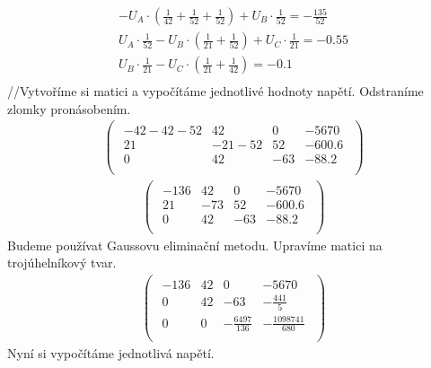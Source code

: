     \begin{gather*}
		-U_A \cdot(\frac{1}{42} + \frac{1}{52} + \frac{1}{52}) + U_B \cdot \frac{1}{52} = -\frac{135}{52}\\
        U_A \cdot \frac{1}{52} - U_B \cdot (\frac{1}{21} + \frac{1}{52}) + U_C \cdot \frac{1}{21} = - 0.55\\
        U_B \cdot \frac{1}{21} - U_C \cdot (\frac{1}{21} + \frac{1}{42}) = -0.1\\
	\end{gather*}
    //Vytvoříme si matici a vypočítáme jednotlivé hodnoty napětí. Odstraníme zlomky pronásobením.
    \begin{gather*}
		\begin{pmatrix}
        \begin{array}{ccc|c}
            -42-42-52 & 42 & 0 &  -5670 \\
            21 & -21-52 & 52  &  -600.6 \\
            0 & 42 & -63 & -88.2 \\
        \end{array}
        \end{pmatrix}
	\end{gather*}
	\begin{gather*}
		\begin{pmatrix}
        \begin{array}{ccc|c}
            -136 & 42 & 0 &  -5670 \\
            21 & -73 & 52  &  -600.6 \\
            0 & 42 & -63 & -88.2 \\
        \end{array}
        \end{pmatrix}
	\end{gather*}
    Budeme používat Gaussovu eliminační metodu. Upravíme matici na trojúhelníkový tvar.
    \begin{gather*}
		\begin{pmatrix}
        \begin{array}{ccc|c}
            -136 & 42 & 0 &  -5 670 \\
            0 & 42 & -63  &  -\frac{441}{5} \\
            0 & 0 & -\frac{6497}{136} & -\frac{1098741}{680} \\
        \end{array}
        \end{pmatrix}
	\end{gather*}
	\newpage
    Nyní si vypočítáme jednotlivá napětí.
